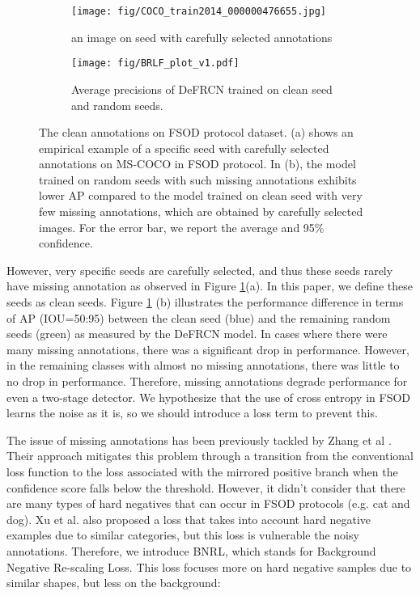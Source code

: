 \documentclass{article}
\begin{document}
\begin{figure}[ht]
    \centering
    \begin{subfigure}[]{0.45\textwidth}
    \texttt{[image: fig/COCO\_train2014\_000000476655.jpg]}
    \caption{an image on seed with carefully selected annotations}
    \end{subfigure}
    \begin{subfigure}[]{0.48\textwidth}
\texttt{[image: fig/BRLF\_plot\_v1.pdf]}
    \caption{Average precisions of DeFRCN trained on clean seed and random seeds.}
    \end{subfigure}
\caption{
The clean annotations on FSOD protocol dataset. 
(a) shows an empirical example of a specific seed with carefully selected annotations on MS-COCO in FSOD protocol.
In (b), the model trained on random seeds with such missing annotations exhibits lower AP compared to the model trained on clean seed with very few missing annotations, which are obtained by carefully selected images. For the error bar, we report the average and 95\% confidence.}
\label{fig:negative sample2}
\end{figure}
    
However, very specific seeds are carefully selected, and thus these seeds rarely have missing annotation as observed in Figure \ref{fig:negative sample2}(a).
In this paper, we define these seeds as clean seeds.
Figure \ref{fig:negative sample2} (b) illustrates the performance difference in terms of AP (IOU=50:95) between the clean seed (blue) and the remaining random seeds (green) as measured by the DeFRCN model.
In cases where there were many missing annotations, there was a significant drop in performance. However, in the remaining classes with almost no missing annotations, there was little to no drop in performance.
Therefore, missing annotations degrade performance for even a two-stage detector.
We hypothesize that the use of cross entropy in FSOD learns the noise as it is, so we should introduce a loss term to prevent this.

The issue of missing annotations has been previously tackled by Zhang et al \cite{BRL}. 
Their approach mitigates this problem through a transition from the conventional loss function to the loss associated with the mirrored positive branch when the confidence score falls below the threshold.
However, it didn't consider that there are many types of hard negatives that can occur in FSOD protocols (e.g. cat and dog).
Xu et al. \cite{fssp} also proposed a loss that takes into account hard negative examples due to similar categories, but this loss is vulnerable the noisy annotations.
Therefore, we introduce BNRL, which stands for Background Negative Re-scaling Loss. This loss focuses more on hard negative samples due to similar shapes, but less on the background: 
\end{document}
